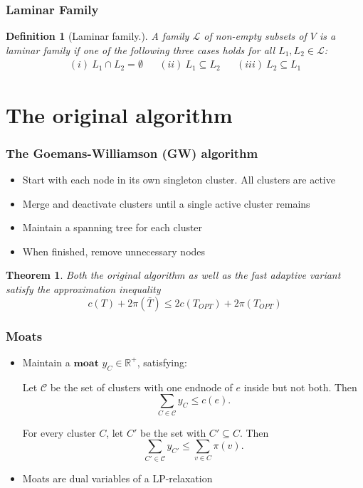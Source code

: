 \documentclass[11pt]{beamer}
\newtheorem{mydef}{Definition}
\newtheorem{theo}{Theorem}
\begin{document}
\begin{frame} 
	\frametitle{Laminar Family}
	\begin{mydef}[Laminar family.]
		A family $\mathcal{L}$ of non-empty subsets of $V$ is a laminar family if one of the following three cases holds for all $L_1, L_2 \in \mathcal{L}$:
		\begin{align*}
		(i) \ L_1 \cap L_2 = \emptyset && (ii) \ L_1 \subseteq L_2 && (iii) \ L_2 \subseteq L_1
		\end{align*}
	\end{mydef}
\end{frame}

\section{The original algorithm}
\begin{frame} 
	\frametitle{The Goemans-Williamson (GW) algorithm}
	\begin{itemize}
		\item Start with each node in its own singleton cluster. All clusters are active
		\item Merge and deactivate clusters until a single active cluster remains
		\item Maintain a spanning tree for each cluster 
		\item When finished, remove unnecessary nodes
	\end{itemize}
	\begin{theo}
			Both the original algorithm as well as the fast adaptive variant satisfy the
			approximation inequality
		\begin{equation*}
			c(T)+2\pi(\bar T) \le 2 c(T_{OPT}) + 2\pi (T_{OPT})
		\end{equation*}
	\end{theo}
\end{frame}

\begin{frame} 
	\frametitle{Moats}
		\begin{itemize}
	\item Maintain a $\textbf{moat}$ $y_C \in \mathbb{R}^+$, satisfying:
		
		\begin{tcolorbox}[colback=green!5,colframe=green!40!black,title=Edge-inequality]
			Let $\mathcal{C}$ be the set of clusters with one endnode of $e$ inside but not both. Then
			\begin{equation*}
			\sum_{C \in \mathcal{C}} y_C \le c(e).
			\end{equation*}
		\end{tcolorbox}
		\begin{tcolorbox}[colback=green!5,colframe=green!40!black,title=Cluster-inequality]
			For every cluster $C$, let $C'$ be the set with $C' \subseteq C$. Then
			\begin{equation*}
			\sum_{C' \in \mathcal{C}}y_{C'} \le \sum_{v \in C} \pi(v).
			\end{equation*}
		\end{tcolorbox}
		\item Moats are dual variables of a LP-relaxation 
	\end{itemize}
\end{frame}
\end{document}
